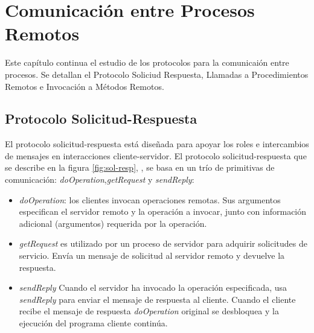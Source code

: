 
\setchapterpreamble[u]{\margintoc}

\chapter{Comunicación entre Procesos Remotos }
\label{ch:Comunicación entre Procesos}

Este capítulo continua el estudio de los protocolos para la comunicaión entre procesos. Se detallan el Protocolo Soliciud Respuesta, Llamadas a Procedimientos Remotos e Invocación a Métodos Remotos.

\section{Protocolo Solicitud-Respuesta}
\label{sec:sol-resp}

El protocolo solicitud-respuesta  está diseñada para apoyar los roles e intercambios de mensajes en interacciones cliente-servidor. El \gls{protocolo solicitud-respuesta} que se describe en la figura \ref{fig:sol-resp}, \cite{Steen2017} \cite{Coulouris2011},  se basa en un trío de primitivas de comunicación: \textit{doOperation},\textit{getRequest} y \textit{sendReply}:

\begin{itemize} 
	\item \textit{doOperation}: los clientes invocan operaciones remotas. Sus argumentos especifican el servidor remoto y la operación a invocar, junto con información adicional (argumentos) requerida por la operación. 
	
	\item \textit{getRequest} es utilizado por un proceso de servidor para adquirir solicitudes de servicio.  Envía un mensaje de solicitud al servidor remoto y devuelve la respuesta.   
	
	\item \textit{sendReply} Cuando el servidor ha invocado la operación especificada, usa \textit{sendReply} para enviar el mensaje de respuesta al cliente.
	Cuando el cliente recibe el mensaje de respuesta \textit{doOperation} original se desbloquea y la ejecución del programa cliente continúa.   
\end{itemize}

